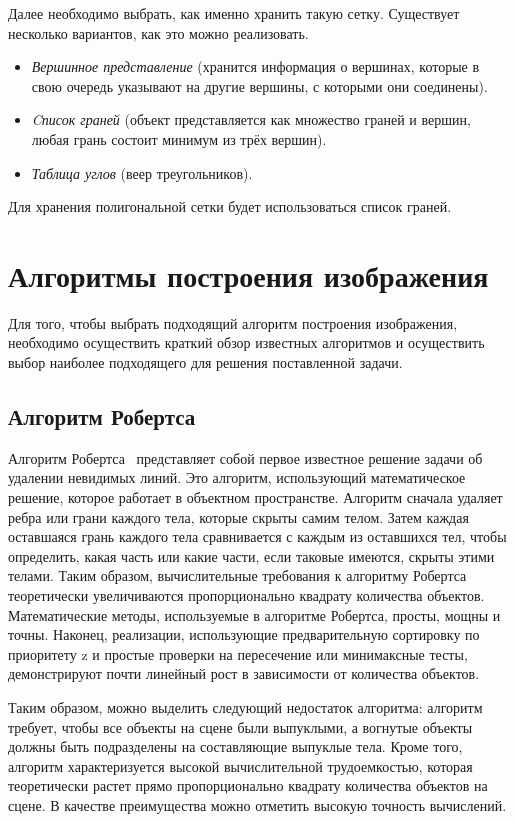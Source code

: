Далее необходимо выбрать, как именно хранить такую сетку. Существует несколько вариантов, как это можно реализовать.

\begin{itemize}[label=---]
    \item \textit{Вершинное представление} (хранится информация о вершинах, которые в свою очередь указывают на другие вершины, с которыми они соединены).
    \item \textit{Cписок граней} (объект представляется как множество граней и вершин, любая грань состоит минимум из трёх вершин).
    \item \textit{Таблица углов} (веер треугольников).
\end{itemize}

Для хранения полигональной сетки будет использоваться список граней.

\section{Алгоритмы построения изображения}

Для того, чтобы выбрать подходящий алгоритм построения изображения, необходимо осуществить краткий обзор известных алгоритмов и осуществить выбор наиболее подходящего для решения поставленной задачи.



\subsection{Алгоритм Робертса}
Алгоритм Робертса~\cite{math_cg} представляет собой первое известное решение задачи об удалении невидимых линий. Это алгоритм, использующий математическое решение, которое работает в объектном пространстве. Алгоритм сначала удаляет ребра или грани каждого тела, которые скрыты самим телом. Затем каждая оставшаяся грань каждого тела сравнивается с каждым из оставшихся тел, чтобы определить, какая часть или какие части, если таковые имеются, скрыты этими телами. Таким образом, вычислительные требования к алгоритму Робертса теоретически увеличиваются пропорционально квадрату количества объектов. Математические методы, используемые в алгоритме Робертса, просты, мощны и точны. Наконец, реализации, использующие предварительную сортировку по приоритету z и простые проверки на пересечение или минимаксные тесты, демонстрируют почти линейный рост в зависимости от количества объектов.

Таким образом, можно выделить следующий недостаток алгоритма: алгоритм требует, чтобы все объекты на сцене были выпуклыми, а вогнутые объекты должны быть подразделены на составляющие выпуклые тела. Кроме того, алгоритм характеризуется высокой вычислительной трудоемкостью, которая теоретически растет прямо пропорционально квадрату количества объектов на сцене.
В качестве преимущества можно отметить высокую точность вычислений.


